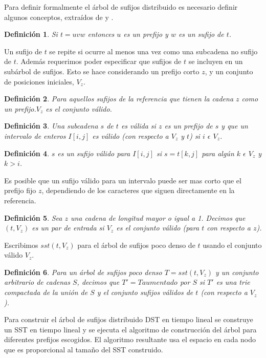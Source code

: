 \documentclass[12pt,a4paper]{article}
\newtheorem{mydef}{Definición}
\begin{document}
Para definir formalmente el árbol de sufijos distribuido es necesario definir 
algunos conceptos, extraídos de \cite{Clifford2005} y \cite{Ghoting2010}. 
\begin{mydef}
  Si $t=uvw$ entonces $u$ es un \textit{prefijo} y $w$ es un \textit{sufijo}
de $t$.
\end{mydef}
Un sufijo de $t$ se repite si ocurre al menos una vez como una subcadena no sufijo de $t$.
Además requerimos poder especificar que sufijos de $t$ se incluyen en un subárbol de sufijos. Esto
se hace considerando un prefijo corto $z$, y un conjunto de posiciones iniciales, $V_{z}$.
\begin{mydef}
  Para aquellos sufijos de la referencia que tienen la cadena $z$ como un prefijo.$V_{z}$ es el conjunto válido.
\end{mydef}
\begin{mydef}
Una subcadena $s$ de $t$ es válida si $z$ es un prefijo de $s$ y que un intervalo de enteros $I[i,j]$ es
\textit{válido} (con respecto a $V_{z}$ y $t$) si $i$ $\epsilon$ $V_{z}$.
\end{mydef}
\begin{mydef}
  $s$ es un \textit{sufijo válido} para $I[i,j]$ si $s=t[k,j]$ para algún $k$ $\epsilon$ $V_{z}$ y $k>i$. 
\end{mydef}
Es posible que un sufijo válido para un intervalo puede ser mas corto que el prefijo fijo $z$, dependiendo de 
los caracteres que siguen directamente en la referencia.\\
\begin{mydef}
  Sea $z$ una cadena de longitud mayor o igual a 1. Decimos que $(t,V_{z})$ es un \textit{par de entrada} si $V_{z}$ es
el conjunto válido (para $t$ con respecto a $z$).
\end{mydef}
Escribimos $sst(t,V_{z})$ para el árbol de sufijos poco denso de $t$ usando el conjunto válido $V_{z}$. 
\begin{mydef}
  Para un árbol de sufijos poco denso $T=sst(t,V_{z})$ y un conjunto arbitrario de cadenas $S$, decimos que
  $T'=T aumentado$ por $S$ si $T'$ es una trie compactada de la unión de $S$ y el conjunto sufijos válidos de
  $t$ (con respecto a $V_{z}$).
\end{mydef}
Para construir el árbol de sufijos distribuido DST en tiempo lineal se construye un SST en tiempo lineal
y se ejecuta el algoritmo de construcción del árbol para diferentes prefijos escogidos. El algoritmo
resultante usa el espacio en cada nodo que es proporcional al tamaño del SST construido.
\end{document}
